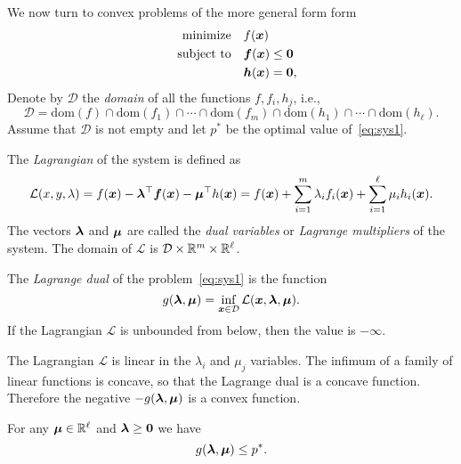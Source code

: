 We now turn to convex problems of the more general form form
\begin{align}\label{eq:sys1}
\begin{split}
 \text{minimize}\quad & f(\bm{x})\\
 \quad\text{subject to}\quad & \bm{f}(\bm{x})\leq \bm{0}\\
         & \bm{h}(\bm{x})= \bm{0},
\end{split}
\end{align}
Denote by $\mathcal{D}$ the {\em domain} of all the functions $f,f_i,h_j$, i.e., 
\begin{equation*}
 \mathcal{D} = \mathrm{dom}(f)\cap \mathrm{dom}(f_1)\cap\cdots\cap\mathrm{dom}(f_m)\cap \mathrm{dom}(h_1)\cap\cdots \cap \mathrm{dom}(h_\ell).
\end{equation*}
Assume that $\mathcal{D}$ is not empty and let $p^*$ be the optimal value of~\eqref{eq:sys1}.

The {\em Lagrangian} of the system is defined as
\begin{equation*}
 \mathcal{L}(x,y,\lambda) = f(\bm{x})-\bm{\lambda}^{\top}\bm{f}(\bm{x})-\bm{\mu}^{\top}h(\bm{x}) = f(\bm{x}) +\sum_{i=1}^m \lambda_i f_i(\bm{x})+\sum_{i=1}^\ell \mu_i h_i(\bm{x}).
\end{equation*}
The vectors $\bm{\lambda}$ and $\bm{\mu}$ are called the {\em dual variables} or {\em Lagrange multipliers} of the system. The domain of $\mathcal{L}$ is $\mathcal{D}\times \mathbb{R}^m\times \mathbb{R}^{\ell}$. 

\begin{definition}
 The {\em Lagrange dual} of the problem~\eqref{eq:sys1} is the function
 \begin{equation*}
  g(\bm{\lambda},\bm{\mu}) = \inf_{\bm{x}\in \mathcal{D}} \mathcal{L}(\bm{x},\bm{\lambda},\bm{\mu}).
 \end{equation*}
If the Lagrangian $\mathcal{L}$ is unbounded from below, then the value is $-\infty$.
\end{definition}

The Lagrangian $\mathcal{L}$ is linear in the $\lambda_i$ and $\mu_j$ variables. The infimum of a family of linear functions is concave, so that the Lagrange dual is a concave function. Therefore the negative $-g(\bm{\lambda},\bm{\mu})$ is a convex function.

\begin{lemma}\label{le:lag1}
 For any $\bm{\mu}\in \mathbb{R}^{\ell}$ and $\bm{\lambda}\geq \bm{0}$ we have
 \begin{equation*}
 g(\bm{\lambda},\bm{\mu})\leq p^*.
 \end{equation*}
\end{lemma}

